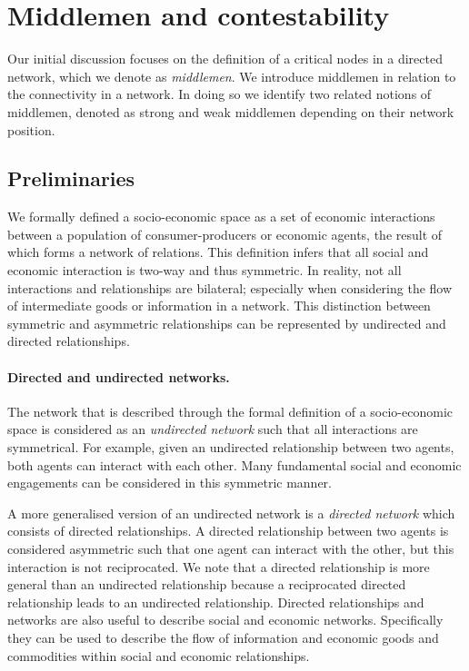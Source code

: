 \section{Middlemen and contestability}

Our initial discussion focuses on the definition of a critical nodes in a directed network, which we denote as \emph{middlemen}. We introduce middlemen in relation to the connectivity in a network. In doing so we identify two related notions of middlemen, denoted as strong and weak middlemen depending on their network position.

\subsection{Preliminaries}

We formally defined a socio-economic space as a set of economic interactions between a population of consumer-producers or economic agents, the result of which forms a network of relations. This definition infers that all social and economic interaction is two-way and thus symmetric. In reality, not all interactions and relationships are bilateral; especially when considering the flow of intermediate goods or information in a network. This distinction between symmetric and asymmetric relationships can be represented by undirected and directed relationships.

\paragraph{Directed and undirected networks.}

The network that is described through the formal definition of a socio-economic space is considered as an \emph{undirected network} such that all interactions are symmetrical. For example, given an undirected relationship between two agents, both agents can interact with each other. Many fundamental social and economic engagements can be considered in this symmetric manner.

A more generalised version of an undirected network is a \emph{directed network} which consists of directed relationships. A directed relationship between two agents is considered asymmetric such that one agent can interact with the other, but this interaction is not reciprocated. We note that a directed relationship is more general than an undirected relationship because a reciprocated directed relationship leads to an undirected relationship. Directed relationships and networks are also useful to describe social and economic networks. Specifically they can be used to describe the flow of information and economic goods and commodities within social and economic relationships.

